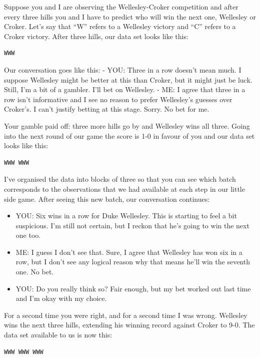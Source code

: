 \documentclass[
]{book}
\providecommand{\tightlist}{%
  \setlength{\itemsep}{0pt}\setlength{\parskip}{0pt}}
\begin{document}
Suppose you and I are observing the Wellesley-Croker competition and after every three hills you and I have to predict who will win the next one, Wellesley or Croker. Let's say that ``W'' refers to a Wellesley victory and ``C'' refers to a Croker victory. After three hills, our data set looks like this:

\begin{verbatim}
WWW
\end{verbatim}

Our conversation goes like this:
- YOU: Three in a row doesn't mean much. I suppose Wellesley might be better at this than Croker, but it might just be luck. Still, I'm a bit of a gambler. I'll bet on Wellesley.
- ME: I agree that three in a row isn't informative and I see no reason to prefer Wellesley's guesses over Croker's. I can't justify betting at this stage. Sorry. No bet for me.

Your gamble paid off: three more hills go by and Wellesley wins all three. Going into the next round of our game the score is 1-0 in favour of you and our data set looks like this:

\begin{verbatim}
WWW WWW
\end{verbatim}

I've organised the data into blocks of three so that you can see which batch corresponds to the observations that we had available at each step in our little side game. After seeing this new batch, our conversation continues:

\begin{itemize}
\tightlist
\item
  YOU: Six wins in a row for Duke Wellesley. This is starting to feel a bit suspicious. I'm still not certain, but I reckon that he's going to win the next one too.
\item
  ME: I guess I don't see that. Sure, I agree that Wellesley has won six in a row, but I don't see any logical reason why that means he'll win the seventh one. No bet.
\item
  YOU: Do you really think so? Fair enough, but my bet worked out last time and I'm okay with my choice.
\end{itemize}

For a second time you were right, and for a second time I was wrong. Wellesley wins the next three hills, extending his winning record against Croker to 9-0. The data set available to us is now this:

\begin{verbatim}
WWW WWW WWW
\end{verbatim}
\end{document}
